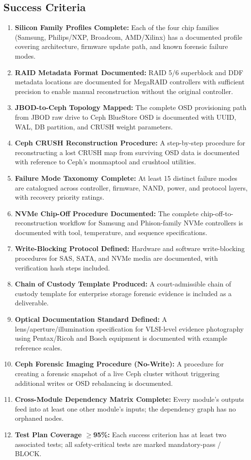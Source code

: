 \documentclass[11pt,letterpaper]{article}
\begin{document}
\subsection{Success Criteria}

\begin{enumerate}[leftmargin=*]
  \item \textbf{Silicon Family Profiles Complete:} Each of the four chip families (Samsung, Philips/NXP, Broadcom, AMD/Xilinx) has a documented profile covering architecture, firmware update path, and known forensic failure modes.
  \item \textbf{RAID Metadata Format Documented:} RAID 5/6 superblock and DDF metadata locations are documented for MegaRAID controllers with sufficient precision to enable manual reconstruction without the original controller.
  \item \textbf{JBOD-to-Ceph Topology Mapped:} The complete OSD provisioning path from JBOD raw drive to Ceph BlueStore OSD is documented with UUID, WAL, DB partition, and CRUSH weight parameters.
  \item \textbf{Ceph CRUSH Reconstruction Procedure:} A step-by-step procedure for reconstructing a lost CRUSH map from surviving OSD data is documented with reference to Ceph's monmaptool and crushtool utilities.
  \item \textbf{Failure Mode Taxonomy Complete:} At least 15 distinct failure modes are catalogued across controller, firmware, NAND, power, and protocol layers, with recovery priority ratings.
  \item \textbf{NVMe Chip-Off Procedure Documented:} The complete chip-off-to-reconstruction workflow for Samsung and Phison-family NVMe controllers is documented with tool, temperature, and sequence specifications.
  \item \textbf{Write-Blocking Protocol Defined:} Hardware and software write-blocking procedures for SAS, SATA, and NVMe media are documented, with verification hash steps included.
  \item \textbf{Chain of Custody Template Produced:} A court-admissible chain of custody template for enterprise storage forensic evidence is included as a deliverable.
  \item \textbf{Optical Documentation Standard Defined:} A lens/aperture/illumination specification for VLSI-level evidence photography using Pentax/Ricoh and Bosch equipment is documented with example reference scales.
  \item \textbf{Ceph Forensic Imaging Procedure (No-Write):} A procedure for creating a forensic snapshot of a live Ceph cluster without triggering additional writes or OSD rebalancing is documented.
  \item \textbf{Cross-Module Dependency Matrix Complete:} Every module's outputs feed into at least one other module's inputs; the dependency graph has no orphaned nodes.
  \item \textbf{Test Plan Coverage $\geq$95\%:} Each success criterion has at least two associated tests; all safety-critical tests are marked mandatory-pass / BLOCK.
\end{enumerate}
\end{document}
